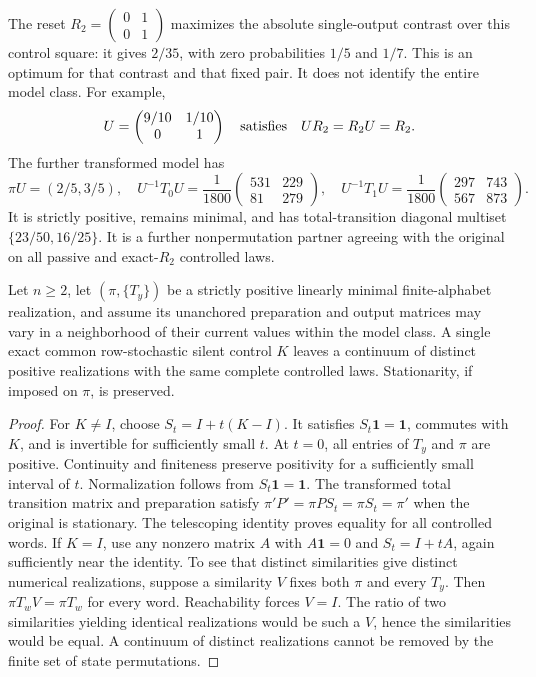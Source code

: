 The reset \(R_2=\left(\begin{smallmatrix}0&1\\0&1\end{smallmatrix}\right)\)
maximizes the absolute single-output contrast over this control square:
it gives \(2/35\), with zero probabilities \(1/5\) and \(1/7\).
This is an optimum for that contrast and that fixed pair.
It does not identify the entire model class.  For example,
\[
 U=\begin{pmatrix}9/10&1/10\\0&1\end{pmatrix}
 \quad\hbox{satisfies}\quad UR_2=R_2U=R_2 .
\]
The further transformed model has
\[
 \pi U=(2/5,3/5),\quad
 U^{-1}T_0U=\frac1{1800}\begin{pmatrix}531&229\\81&279\end{pmatrix},
 \quad
 U^{-1}T_1U=\frac1{1800}\begin{pmatrix}297&743\\567&873\end{pmatrix}.
\]
It is strictly positive, remains minimal, and has total-transition
diagonal multiset \(\{23/50,16/25\}\).
It is a further nonpermutation partner agreeing with the original on
all passive and exact-\(R_2\) controlled laws.

\begin{theorem}\label{op:single-control}
Let \(n\ge2\), let \((\pi,\{T_y\})\) be a strictly positive linearly
minimal finite-alphabet realization, and assume its unanchored
preparation and output matrices may vary in a neighborhood of their
current values within the model class.  A single exact common
row-stochastic silent control \(K\) leaves a continuum of distinct
positive realizations with the same complete controlled laws.
Stationarity, if imposed on \(\pi\), is preserved.
\end{theorem}
\begin{proof}
For \(K\ne I\), choose \(S_t=I+t(K-I)\).
It satisfies \(S_t\mathbf1=\mathbf1\), commutes with \(K\), and is
invertible for sufficiently small \(t\).
At \(t=0\), all entries of \(T_y\) and \(\pi\) are positive.
Continuity and finiteness preserve positivity for a sufficiently small
interval of \(t\).  Normalization follows from \(S_t\mathbf1=\mathbf1\).
The transformed total transition matrix and preparation satisfy
\(\pi'P'=\pi P S_t=\pi S_t=\pi'\) when the original is stationary.
The telescoping identity proves equality for all controlled words.
If \(K=I\), use any nonzero matrix \(A\) with \(A\mathbf1=0\) and
\(S_t=I+tA\), again sufficiently near the identity.
To see that distinct similarities give distinct numerical realizations,
suppose a similarity \(V\) fixes both \(\pi\) and every \(T_y\).
Then \(\pi T_wV=\pi T_w\) for every word.  Reachability forces \(V=I\).
The ratio of two similarities yielding identical realizations would
be such a \(V\), hence the similarities would be equal.
A continuum of distinct realizations cannot be removed by the finite
set of state permutations.
\end{proof}

